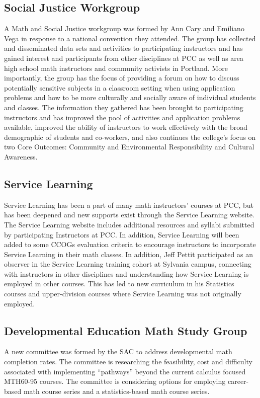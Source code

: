 \subsection{Social Justice Workgroup}
A Math and Social Justice workgroup was formed by Ann Cary and Emiliano Vega in response to a national convention they attended. The group has collected and disseminated data sets and activities to participating instructors and has gained interest and participants from other disciplines at PCC as well as area high school math instructors and community activists in Portland. More importantly, the group has the focus of providing a forum on how to discuss potentially sensitive subjects in a classroom setting when using application problems and how to be more culturally and socially aware of individual students and classes. The information they gathered has been brought to participating instructors and has improved the pool of activities and application problems available, improved the ability of instructors to work effectively with the broad demographic of students and co-workers, and also continues the college's focus on two Core Outcomes: Community and Environmental Responsibility and Cultural Awareness. 

\subsection{Service Learning}
Service Learning has been a part of many math instructors' courses at PCC, but has been deepened and new supports exist through the Service Learning website. The Service Learning website includes additional resources and syllabi submitted by participating Instructors at PCC. In addition, Service Learning will been added to some CCOGs evaluation criteria to encourage instructors to incorporate Service Learning in their math classes. In addition, Jeff Pettit participated as an observer in the Service Learning training cohort at Sylvania campus, connecting with instructors in other disciplines and understanding how Service Learning is employed in other courses. This has led to new curriculum in his Statistics courses and upper-division courses where Service Learning was not originally employed.

\subsection{Developmental Education Math Study Group}
A new committee was formed by the SAC to address developmental math completion rates. The committee is researching the feasibility, cost and difficulty associated with implementing ``pathways'' beyond the current calculus focused MTH60-95 courses. The committee is considering options for employing career-based math course series and a statistics-based math course series.

